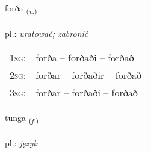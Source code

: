 \documentclass[frontgrid, backgrid]{flacards}\usepackage[]{graphicx}\usepackage[]{xcolor}
\begin{document}
{forða \small{\textsubscript{(\textit{v.})}} \\[1ex] %
\textphonetic{[fɔrða]} \\
pl.: \emph{uratować; zabronić} \\  [2ex]
\renewcommand*{\arraystretch}{0.8}
\begin{tabular}{p{1cm}l}
\textsc{1sg}: & forða -- forðaði -- forðað \\ 
\textsc{2sg}: & forðar -- forðaðir -- forðað \\ 
\textsc{3sg}: & forðar -- forðaði -- forðað \\ 
\end{tabular}
}

\renewcommand{\flhead}{\vskip5pt \fboxsep=0pt {\small\bfseries\footnotesize Nafnorð | Noun}}
\renewcommand{\fcfoot}{\vskip5pt \fboxsep=0pt \hspace{2pt}{\small\bfseries\footnotesize 2K}}

\renewcommand{\blhead}{\vskip5pt {\small\bfseries\footnotesize Nafnorð | Noun }}
\renewcommand{\bcfoot}{\vskip5pt \hspace{2pt}{\small\bfseries\footnotesize 2K}}


{tunga \small{\textsubscript{(\textit{f.})}} \\[1ex] %
\textphonetic{[tʰuŋka]} \\
pl.: \emph{język} \\  [2ex]
\renewcommand*{\arraystretch}{0.8}
}

\renewcommand{\flhead}{\vskip5pt \fboxsep=0pt {\small\bfseries\footnotesize Nafnorð | Noun}}
\renewcommand{\fcfoot}{\vskip5pt \fboxsep=0pt \hspace{2pt}{\small\bfseries\footnotesize 2K}}
\end{document}
